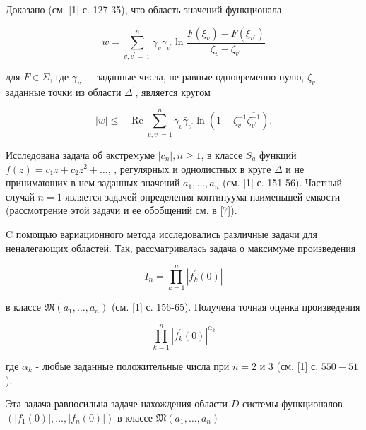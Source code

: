 \documentclass[10pt]{article}
\begin{document}
Доказано (см. [1] с. 127-35), что область значений функционала



\[

w=\sum_{v, v^{\prime}=\imath}^{n} \gamma_{v} \gamma_{v^{\prime}} \ln \frac{F\left(\xi_{v}\right)-F\left(\xi_{v^{\prime}}\right)}{\zeta_{v}-\zeta_{v^{\prime}}}

\]



для $F \in \Sigma$, где $\gamma_{v}-$ заданные числа, не равные одновременно нулю, $\zeta_{v}$ - заданные точки из области $\Delta^{\prime}$, является кругом



\[

|w| \leqslant-\operatorname{Re} \sum_{v, v^{\prime}=1}^{n} \gamma_{v} \bar{\gamma}_{v^{\prime}} \ln \left(1-\zeta_{v}^{-1} \overline{\zeta_{v^{\prime}}^{-1}}\right) .

\]



Исследована задача об әкстремуме $\left|c_{n}\right|, n \geqslant 1$, в классе $S_{a}$ функций $f(z)=c_{1} z+c_{2} z^{2}+\ldots$, , регулярных и однолистных в круге $\Delta$ и не принимающих в нем заданных значений $a_{1}, \ldots, a_{n}$ (см. [1] с. 151-56). Частный случай $n=1$ является задачей определения континуума наименьшей емкости (рассмотрение этой задачи и ее обобщений см. в [7]).



C помощью вариационного метода исследовались различные задачи для неналегающих областей. Так, рассматривалась задача о максимуме произведения



\[

I_{n}=\prod_{k=1}^{n}\left|f_{k}^{\prime}(0)\right|

\]



в классе $\mathfrak{M}\left(a_{1}, \ldots, a_{n}\right)$ (см. [1] с. 156-65). Получена точная оценка произведения



\[

\prod_{k=1}^{n}\left|f_{k}^{\prime}(0)\right|^{\alpha_{k}}

\]



где $\alpha_{k}$ - любые заданные положительные числа при $n=2$ и 3 (см. [1] с. $550-51$ ).



Эта задача равносильна задаче нахождения области $D$ системы функционалов $\left(\left|f_{1}(0)\right|, \ldots,\left|f_{n}(0)\right|\right)$ в классе $\mathfrak{M}\left(a_{1}, \ldots, a_{n}\right)$
\end{document}
